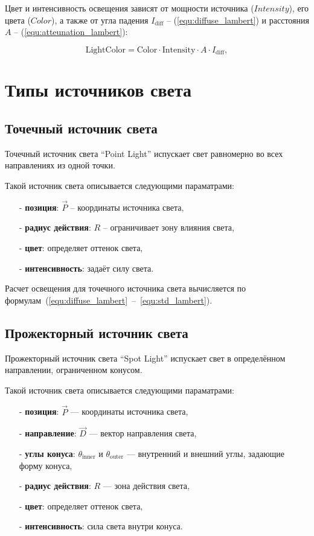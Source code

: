 Цвет и интенсивность освещения зависят от мощности источника (\(Intensity\)), его цвета (\(Color\)), а также от угла падения \(I_{\text{diff}}\) -- (\ref{equ:diffuse_lambert}) и расстояния \(A\) -- (\ref{equ:atteunation_lambert}):

\begin{equation}
    \label{equ:std_lambert}
    \text{LightColor} = \text{Color} \cdot \text{Intensity} \cdot A \cdot I_{\text{diff}},
\end{equation}

\section{Типы источников света}

\subsection*{Точечный источник света}

Точечный источник света \enquote{Point Light} испускает свет равномерно во всех направлениях из одной точки. 

Такой источник света описывается следующими параматрами:

\begin{itemize}
    \item[-] \textbf{позиция}: \(\vec{P}\) -- координаты источника света,
    \item[-] \textbf{радиус действия}: \(R\) -- ограничивает зону влияния света,
    \item[-] \textbf{цвет}: определяет оттенок света,
    \item[-] \textbf{интенсивность}: задаёт силу света.
\end{itemize}

Расчет освещения для точечного источника света вычисляется по формулам~(\ref{equ:diffuse_lambert}~--~\ref{equ:std_lambert}).

\subsection*{Прожекторный источник света}

Прожекторный источник света \enquote{Spot Light} испускает свет в определённом направлении,
ограниченном конусом.

Такой источник света описывается следующими параматрами:

\begin{itemize}
    \item[-] \textbf{позиция}: \(\vec{P}\) — координаты источника света,
    \item[-] \textbf{направление}: \(\vec{D}\) — вектор направления света,
    \item[-] \textbf{углы конуса}: \(\theta_{\text{inner}}\) и \(\theta_{\text{outer}}\) — внутренний и внешний углы, задающие форму конуса,
    \item[-] \textbf{радиус действия}: \(R\) — зона действия света,
    \item[-] \textbf{цвет}: определяет оттенок света,
    \item[-] \textbf{интенсивность}: сила света внутри конуса.
\end{itemize}

